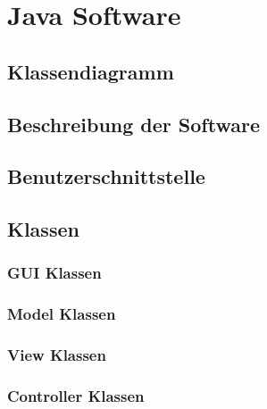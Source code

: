 \section{Java Software}

\subsection{Klassendiagramm}

\subsection{Beschreibung der Software}

\subsection{Benutzerschnittstelle}

\subsection{Klassen}

\subsubsection{GUI Klassen}

\subsubsection{Model Klassen}

\subsubsection{View Klassen}

\subsubsection{Controller Klassen}